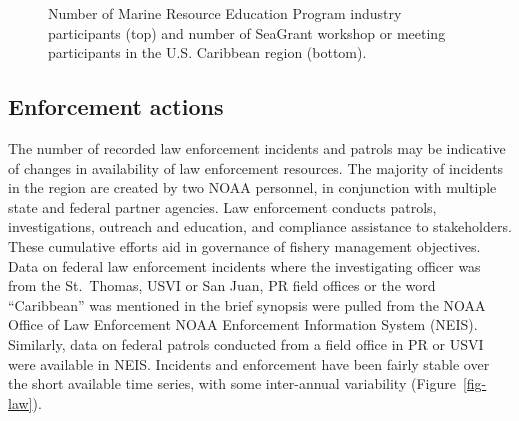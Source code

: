 \documentclass[
  letterpaper,
  oneside,
  open=any]{scrbook}
\begin{document}
\begin{figure}


\caption{\label{fig-outreach}Number of Marine Resource Education Program
industry participants (top) and number of SeaGrant workshop or meeting
participants in the U.S. Caribbean region (bottom).}

\end{figure}%

\subsection{Enforcement actions}\label{enforcement-actions}

The number of recorded law enforcement incidents and patrols may be
indicative of changes in availability of law enforcement resources. The
majority of incidents in the region are created by two NOAA personnel,
in conjunction with multiple state and federal partner agencies. Law
enforcement conducts patrols, investigations, outreach and education,
and compliance assistance to stakeholders. These cumulative efforts aid
in governance of fishery management objectives. Data on federal law
enforcement incidents where the investigating officer was from the
St.~Thomas, USVI or San Juan, PR field offices or the word ``Caribbean''
was mentioned in the brief synopsis were pulled from the NOAA Office of
Law Enforcement NOAA Enforcement Information System (NEIS). Similarly,
data on federal patrols conducted from a field office in PR or USVI were
available in NEIS. Incidents and enforcement have been fairly stable
over the short available time series, with some inter-annual variability
(Figure~\ref{fig-law}).
\end{document}
